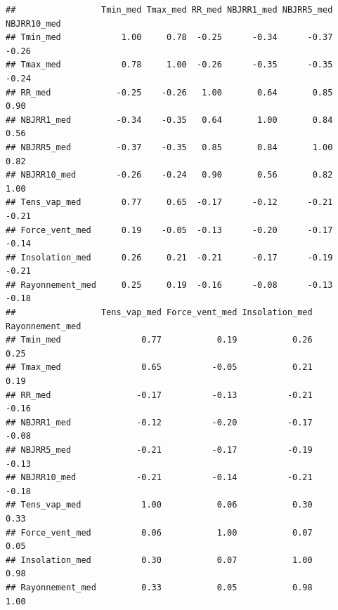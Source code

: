 \documentclass[
]{article}
\newenvironment{Shaded}{\begin{snugshade}}{\end{snugshade}}
\newcommand{\AttributeTok}[1]{\textcolor[rgb]{0.13,0.29,0.53}{#1}}
\newcommand{\DecValTok}[1]{\textcolor[rgb]{0.00,0.00,0.81}{#1}}
\newcommand{\FunctionTok}[1]{\textcolor[rgb]{0.13,0.29,0.53}{\textbf{#1}}}
\newcommand{\NormalTok}[1]{#1}
\newcommand{\SpecialCharTok}[1]{\textcolor[rgb]{0.81,0.36,0.00}{\textbf{#1}}}
\newcommand{\StringTok}[1]{\textcolor[rgb]{0.31,0.60,0.02}{#1}}
\begin{document}
\begin{verbatim}
##                 Tmin_med Tmax_med RR_med NBJRR1_med NBJRR5_med NBJRR10_med
## Tmin_med            1.00     0.78  -0.25      -0.34      -0.37       -0.26
## Tmax_med            0.78     1.00  -0.26      -0.35      -0.35       -0.24
## RR_med             -0.25    -0.26   1.00       0.64       0.85        0.90
## NBJRR1_med         -0.34    -0.35   0.64       1.00       0.84        0.56
## NBJRR5_med         -0.37    -0.35   0.85       0.84       1.00        0.82
## NBJRR10_med        -0.26    -0.24   0.90       0.56       0.82        1.00
## Tens_vap_med        0.77     0.65  -0.17      -0.12      -0.21       -0.21
## Force_vent_med      0.19    -0.05  -0.13      -0.20      -0.17       -0.14
## Insolation_med      0.26     0.21  -0.21      -0.17      -0.19       -0.21
## Rayonnement_med     0.25     0.19  -0.16      -0.08      -0.13       -0.18
##                 Tens_vap_med Force_vent_med Insolation_med Rayonnement_med
## Tmin_med                0.77           0.19           0.26            0.25
## Tmax_med                0.65          -0.05           0.21            0.19
## RR_med                 -0.17          -0.13          -0.21           -0.16
## NBJRR1_med             -0.12          -0.20          -0.17           -0.08
## NBJRR5_med             -0.21          -0.17          -0.19           -0.13
## NBJRR10_med            -0.21          -0.14          -0.21           -0.18
## Tens_vap_med            1.00           0.06           0.30            0.33
## Force_vent_med          0.06           1.00           0.07            0.05
## Insolation_med          0.30           0.07           1.00            0.98
## Rayonnement_med         0.33           0.05           0.98            1.00
\end{verbatim}

\begin{Shaded}
\end{Shaded}
\end{document}
